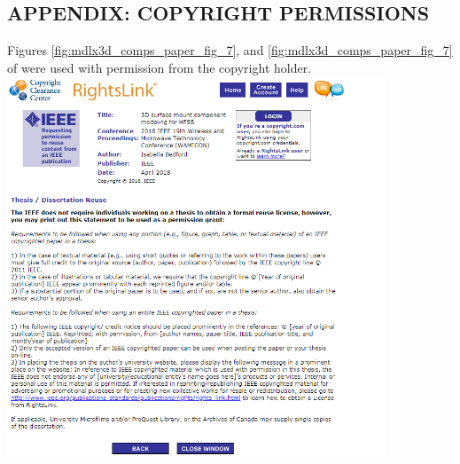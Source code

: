 \documentclass[12pt]{usfcoe}
\newcommand{\usfpagebreak}{\pagebreak\vspace*{0.5in}}
\begin{document}
\usfpagebreak
\begin{center}
\section*{\centering APPENDIX: COPYRIGHT PERMISSIONS}
Figures \ref{fig:mdlx3d_comps_paper_fig_7}, and \ref{fig:mdlx3d_comps_paper_fig_7} of \cite{mdlx_3d_models} were used with permission from the copyright holder.
\includegraphics[width=0.85\textwidth]{ieee_copyright_permissions.PNG}
\end{center}
\end{document}
